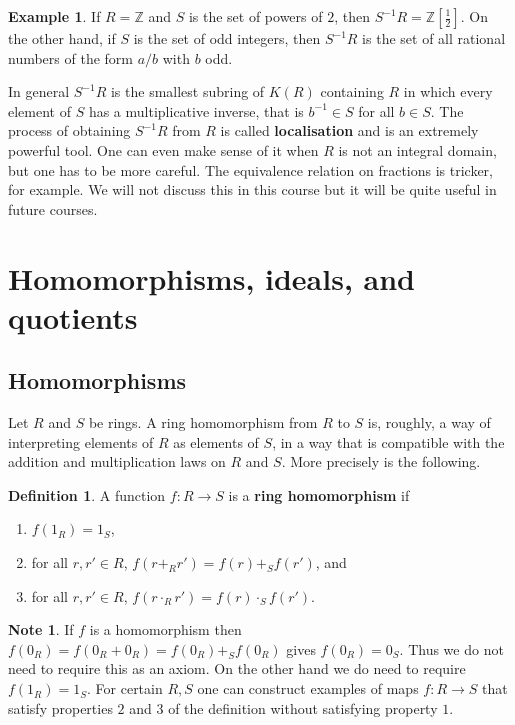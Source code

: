 \documentclass{article}
\newcommand{\Z}{\mathbb{Z}}
\newcommand{\rb}[1]{\left( #1 \right)}
\renewcommand{\sb}[1]{\left[ #1 \right]}
\theoremstyle{definition}\newtheorem{definition}{Definition}[subsection]
\theoremstyle{definition}\newtheorem{remark}[definition]{Remark}
\theoremstyle{definition}\newtheorem*{example}{Example}
\theoremstyle{definition}\newtheorem*{note}{Note}
\begin{document}
\begin{example}
If $ R = \Z $ and $ S $ is the set of powers of $ 2 $, then $ S^{-1}R = \Z\sb{\tfrac{1}{2}} $. On the other hand, if $ S $ is the set of odd integers, then $ S^{-1}R $ is the set of all rational numbers of the form $ a / b $ with $ b $ odd.
\end{example}

In general $ S^{-1}R $ is the smallest subring of $ K\rb{R} $ containing $ R $ in which every element of $ S $ has a multiplicative inverse, that is $ b^{-1} \in S $ for all $ b \in S $. The process of obtaining $ S^{-1}R $ from $ R $ is called \textbf{localisation} and is an extremely powerful tool. One can even make sense of it when $ R $ is not an integral domain, but one has to be more careful. The equivalence relation on fractions is tricker, for example. We will not discuss this in this course but it will be quite useful in future courses.

\section{Homomorphisms, ideals, and quotients}

\subsection{Homomorphisms}

Let $ R $ and $ S $ be rings. A ring homomorphism from $ R $ to $ S $ is, roughly, a way of interpreting elements of $ R $ as elements of $ S $, in a way that is compatible with the addition and multiplication laws on $ R $ and $ S $. More precisely is the following.

\begin{definition}
A function $ f : R \to S $ is a \textbf{ring homomorphism} if
\begin{enumerate}
\item $ f\rb{1_R} = 1_S $,
\item for all $ r, r' \in R $, $ f\rb{r +_R r'} = f\rb{r} +_S f\rb{r'} $, and
\item for all $ r, r' \in R $, $ f\rb{r \cdot_R r'} = f\rb{r} \cdot_S f\rb{r'} $.
\end{enumerate}
\end{definition}

\begin{note}
If $ f $ is a homomorphism then $ f\rb{0_R} = f\rb{0_R + 0_R} = f\rb{0_R} +_S f\rb{0_R} $ gives $ f\rb{0_R} = 0_S $. Thus we do not need to require this as an axiom. On the other hand we do need to require $ f\rb{1_R} = 1_S $. For certain $ R, S $ one can construct examples of maps $ f : R \to S $ that satisfy properties $ 2 $ and $ 3 $ of the definition without satisfying property $ 1 $.
\end{note}
\end{document}
